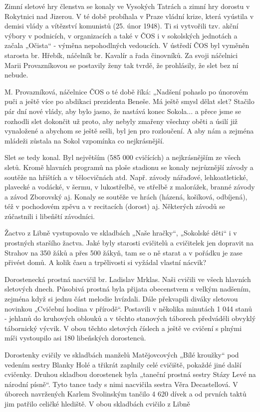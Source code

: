 Zimní sletové hry členstva se konaly ve Vysokých Tatrách a zimní hry
dorostu v Rokytnici nad Jizerou. V té době probíhala v Praze vládní
krize, která vyústila v demisi vlády a vítězství komunistů (25. únor
1948). Ti si vytvořili tzv. akční výbory v podnicích, v organizacích a
také v ČOS i v sokolských jednotách a začala „Očista`` - výměna
nepohodlných vedoucích. V ústředí ČOS byl vyměněn starosta br. Hřebík,
náčelník br. Kavalír a řada činovníků. Za svoji náčelnici Marii
Provazníkovou se postavily ženy tak tvrdě, že prohlásily, že slet bez ní
nebude.

M. Provazníková, náčelnice ČOS o té době říká: „Nadšení pohaslo po
únorovém puči a ještě více po abdikaci prezidenta Beneše. Má ještě smysl
dělat slet? Stačilo pár dní nové vlády, aby bylo jasno, že nastává konec
Sokola... a přece jsme se rozhodli slet dokončit už proto, aby nebyly
zmařeny všechny oběti a úsilí již vynaložené a abychom se ještě sešli,
byl jen pro rozloučení. A aby nám a zejména mládeži zůstala na Sokol
vzpomínka co nejkrásnější.

Slet se tedy konal. Byl největším (585 000 cvičících) a nejkrásnějším ze
všech sletů. Kromě hlavních programů na ploše stadionu se konaly
nejrůznější závody a soutěže na hřištích a v tělocvičnách atd. Např.
závody nářaďové, lehkoatletické, plavecké a vodácké, v šermu, v
lukostřelbě, ve střelbě z malorážek, branné závody a závod Zborovský aj.
Konaly se soutěže ve hrách (házená, košíková, odbíjená), též v
pochodovém zpěvu a v recitacích (dorost) aj. Některých závodů se
zúčastnili i libeňští závodníci.

Žactvo z Libně vystupovalo ve skladbách „Naše hračky``, „Sokolské děti``
i v prostných staršího žactva. Jaké byly starosti cvičitelů a cvičitelek
jen dopravit na Strahov na 350 žáků a přes 500 žákyň, tam se o ně starat
a v pořádku je zase přivést domů. A kolik času a trpělivosti si vyžádal
vlastní nácvik?

Dorostenecká prostná nacvičil br. Ladislav Mrklas. Naši cvičili ve všech
hlavních sletových dnech. Působivá prostná byla přijata obecenstvem s
velkým nadšením, zejména když si jednu část melodie hvízdali. Dále
překvapili diváky sletovou novinkou „Cvičební hodina v přírodě``.
Postavili v několika minutách 1 044 stanů - jehlanů do kruhových oblouků
a v těchto stanových táborech předváděli obvyklý tábornický výcvik. V
obou těchto sletových číslech a ještě ve cvičení s plnými míči
vystoupilo asi 180 libeňských dorostenců.

Dorostenky cvičily ve skladbách manželů Matějovcových „Bílé kroužky``
pod vedením sestry Blanky Holé a třikrát zaplnily celé cvičiště, pokaždé
jiné další cvičenky. Druhou skladbou dorostenek byla „taneční prostná
sestry Stázy Levé na národní písně``. Tyto tance tady s nimi nacvičila
sestra Věra Decastellová. V úborech navržených Karlem Svolinským tančilo
4 620 dívek a od prvních taktů jim patřilo celičké hlediště. V obou
skladbách cvičilo z Libně

